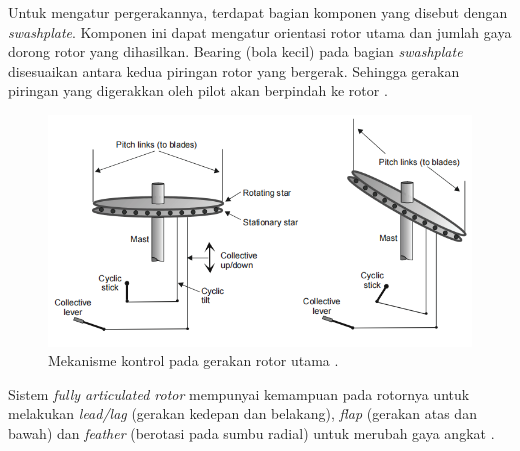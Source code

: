 Untuk mengatur pergerakannya, terdapat bagian komponen yang disebut dengan \textit{swashplate}. Komponen ini dapat mengatur orientasi rotor utama dan jumlah gaya dorong rotor yang dihasilkan. Bearing (bola kecil) pada bagian \textit{swashplate} disesuaikan antara kedua piringan rotor yang bergerak. Sehingga gerakan piringan yang digerakkan oleh pilot akan berpindah ke rotor \cite{wagtendonk2006principles}.

\begin{figure}[H]
	\centering
	\includegraphics[width=0.7\linewidth]{gambar/swashplate.png}
	\caption{Mekanisme kontrol pada gerakan rotor utama \cite{handbook}.}
	\label{fig:swashplate}
\end{figure}
Sistem \textit{fully articulated rotor} mempunyai kemampuan pada rotornya untuk melakukan \textit{lead/lag} (gerakan kedepan dan belakang), \textit{flap} (gerakan atas dan bawah) dan \textit{feather} (berotasi pada sumbu radial) untuk merubah gaya angkat \cite{handbook}.


